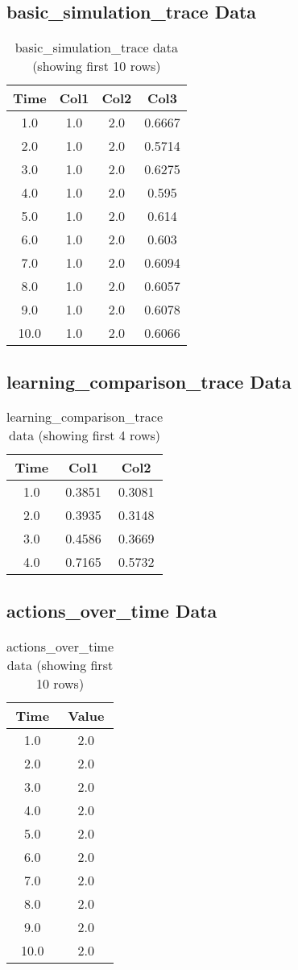 \documentclass{article}
\begin{document}
\subsection{basic_simulation_trace Data}
\begin{table}[h]
\centering
\begin{tabular}{cccc}
\toprule
Time & Col1 & Col2 & Col3 \\
\midrule
1.0 & 1.0 & 2.0 & 0.6667 \\
2.0 & 1.0 & 2.0 & 0.5714 \\
3.0 & 1.0 & 2.0 & 0.6275 \\
4.0 & 1.0 & 2.0 & 0.595 \\
5.0 & 1.0 & 2.0 & 0.614 \\
6.0 & 1.0 & 2.0 & 0.603 \\
7.0 & 1.0 & 2.0 & 0.6094 \\
8.0 & 1.0 & 2.0 & 0.6057 \\
9.0 & 1.0 & 2.0 & 0.6078 \\
10.0 & 1.0 & 2.0 & 0.6066 \\
\bottomrule
\end{tabular}
\caption{basic_simulation_trace data (showing first 10 rows)}
\end{table}

\subsection{learning_comparison_trace Data}
\begin{table}[h]
\centering
\begin{tabular}{ccc}
\toprule
Time & Col1 & Col2 \\
\midrule
1.0 & 0.3851 & 0.3081 \\
2.0 & 0.3935 & 0.3148 \\
3.0 & 0.4586 & 0.3669 \\
4.0 & 0.7165 & 0.5732 \\
\bottomrule
\end{tabular}
\caption{learning_comparison_trace data (showing first 4 rows)}
\end{table}

\subsection{actions_over_time Data}
\begin{table}[h]
\centering
\begin{tabular}{cc}
\toprule
Time & Value \\
\midrule
1.0 & 2.0 \\
2.0 & 2.0 \\
3.0 & 2.0 \\
4.0 & 2.0 \\
5.0 & 2.0 \\
6.0 & 2.0 \\
7.0 & 2.0 \\
8.0 & 2.0 \\
9.0 & 2.0 \\
10.0 & 2.0 \\
\bottomrule
\end{tabular}
\caption{actions_over_time data (showing first 10 rows)}
\end{table}
\end{document}
